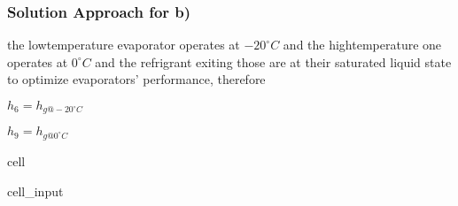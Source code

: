 \documentclass[letterpaper,10pt,english]{jupyterBook}
\begin{document}
\subsubsection{Solution Approach for b)}
\label{\detokenize{notebooks/Chapter5/CH5-Q8:solution-approach-for-b}}
\sphinxAtStartPar
the low\sphinxhyphen{}temperature evaporator operates at \(-20^{\circ} C\) and the high\sphinxhyphen{}temperature one operates at \(0^{\circ} C\) and the refrigrant exiting those are at their saturated liquid state to optimize evaporators’ performance, therefore

\sphinxAtStartPar
\(h_6=h_{g@-20^{\circ} C}\)

\sphinxAtStartPar
\(h_9=h_{g@0^{\circ} C}\)

\begin{sphinxuseclass}{cell}\begin{sphinxVerbatimInput}

\begin{sphinxuseclass}{cell_input}
\begin{sphinxVerbatim}[commandchars=\\\{\}]
     
     

         
         


\end{sphinxVerbatim}
\end{sphinxuseclass}
\end{sphinxVerbatimInput}
\end{sphinxuseclass}
\end{document}
